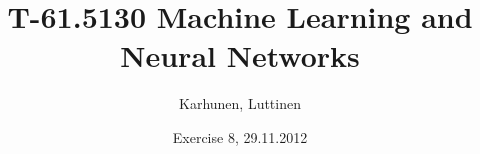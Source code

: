 
\title{T-61.5130 Machine Learning and Neural Networks}
\author{Karhunen, Luttinen}
\date{Exercise 8, 29.11.2012}

\newcommand{\vect}[1]{{\bf{#1}}}
\newcommand{\svect}[1]{\boldsymbol{#1}}
\newcommand{\matr}[1]{\boldsymbol{#1}}

\renewcommand{\vec}[1]{\mathbf{#1}}
\newcommand{\set}[1]{\mathcal{#1}}
\newcommand{\C}{\set{C}}
\newcommand{\E}{\mathcal{E}}
\newcommand{\I}{\vec{I}}
\renewcommand{\L}{\mathcal{L}}
\newcommand{\N}{\mathrm{I \negmedspace N}}
\newcommand{\R}{\mathrm{I \negmedspace R}}
\newcommand{\V}{\set{V}}
\newcommand{\W}{\vec{W}}
\newcommand{\X}{\set{X}}
\newcommand{\e}{\vec{e}}
\newcommand{\h}{\vec{h}}
\newcommand{\m}{\vec{m}}
\newcommand{\mub}{\boldsymbol{\mu}}
\newcommand{\n}{\vec{n}}
\renewcommand{\t}{\vec{t}}
\renewcommand{\u}{\vec{u}}
\renewcommand{\v}{\vec{v}}
\newcommand{\w}{\vec{w}}
\newcommand{\x}{\vec{x}}
\newcommand{\y}{\vec{y}}
\newcommand{\Y}{\vec{Y}}
\newcommand{\z}{\vec{z}}
\newcommand{\argmin}{\operatornamewithlimits{argmin}}
\newcommand{\argmax}{\operatornamewithlimits{argmax}}




\maketitle

